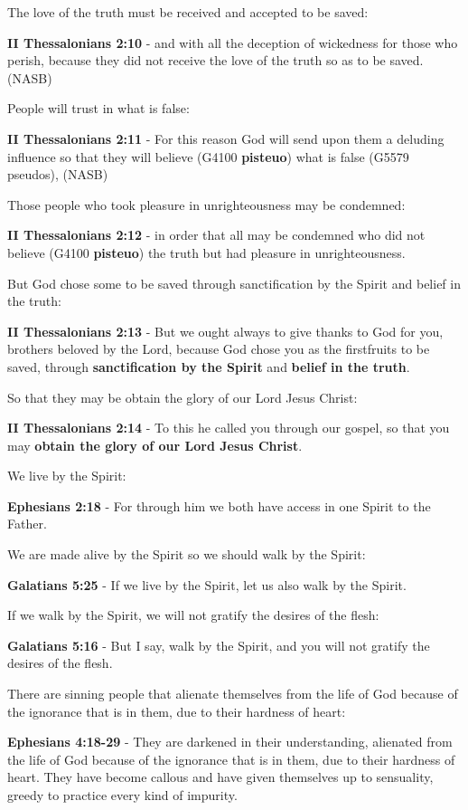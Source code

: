 \documentclass[11pt]{article}
\begin{document}
The love of the truth must be received and accepted to be saved:

\textbf{II Thessalonians 2:10} - and with all the deception of wickedness for those who perish, because they did not receive the love of the truth so as to be saved. (NASB)

People will trust in what is false:

\textbf{II Thessalonians 2:11} - For this reason God will send upon them a deluding influence so that they will believe (G4100 \textbf{pisteuo}) what is false (G5579 pseudos), (NASB)

Those people who took pleasure in unrighteousness may be condemned:

\textbf{II Thessalonians 2:12} - in order that all may be condemned who did not believe (G4100 \textbf{pisteuo}) the truth but had pleasure in unrighteousness.

But God chose some to be saved through sanctification by the Spirit and belief in the truth:

\textbf{II Thessalonians 2:13} - But we ought always to give thanks to God for you, brothers beloved by the Lord, because God chose you as the firstfruits to be saved, through \textbf{sanctification by the Spirit} and \textbf{belief in the truth}.

So that they may be obtain the glory of our Lord Jesus Christ:

\textbf{II Thessalonians 2:14} - To this he called you through our gospel, so that you may \textbf{obtain the glory of our Lord Jesus Christ}.

We live by the Spirit:

\textbf{Ephesians 2:18} - For through him we both have access in one Spirit to the Father.

We are made alive by the Spirit so we should walk by the Spirit:

\textbf{Galatians 5:25} - If we live by the Spirit, let us also walk by the Spirit.

If we walk by the Spirit, we will not gratify the desires of the flesh:

\textbf{Galatians 5:16} - But I say, walk by the Spirit, and you will not gratify the desires of the flesh.

There are sinning people that alienate themselves from the life of God because of the ignorance that is in them, due to their hardness of heart:

\textbf{Ephesians 4:18-29} - They are darkened in their understanding, alienated from the life of God because of the ignorance that is in them, due to their hardness of heart. They have become callous and have given themselves up to sensuality, greedy to practice every kind of impurity.
\end{document}
